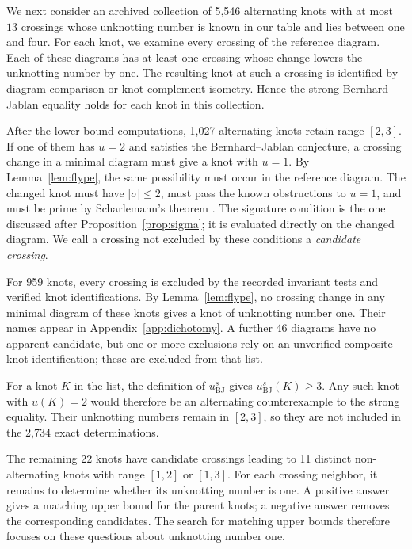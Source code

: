 \documentclass[12pt, oneside]{amsart}
\newcommand{\nChildren}{11}
\newcommand{\nDataKnots}{5{,}546}
\newcommand{\nDichotomy}{959}
\newcommand{\nDichotomyHeuristic}{46}
\newcommand{\nExact}{2{,}734}
\newcommand{\nOpenTwoThreeAlt}{1{,}027}
\newcommand{\nWithCandidates}{22}
\begin{document}
We next consider an archived collection of \nDataKnots{} alternating knots with at most $13$ crossings whose
unknotting number is known in our table and lies between one and four. For each knot,
we examine every crossing of the reference diagram. Each of these diagrams has at least one crossing whose change
lowers the unknotting number by one. The resulting knot at such a crossing is identified
by diagram comparison or knot-complement isometry. Hence the strong
Bernhard--Jablan equality holds for each knot in this collection.

After the lower-bound computations,
\nOpenTwoThreeAlt{} alternating knots retain range $[2,3]$. If one of them has $u=2$
and satisfies the Bernhard--Jablan conjecture, a crossing change in a minimal diagram must
give a knot with $u=1$. By Lemma~\ref{lem:flype}, the same possibility must occur in the
reference diagram. The changed knot must have $|\sigma|\le2$, must pass the known
obstructions to $u=1$, and must be prime by Scharlemann's theorem \cite{Scharlemann}.
The signature condition is the one discussed after
Proposition~\ref{prop:sigma}; it is evaluated directly on the changed diagram.
We call a crossing not excluded by these conditions a \emph{candidate crossing}.

For \nDichotomy{} knots, every crossing is excluded by the recorded invariant tests and
verified knot identifications. By Lemma~\ref{lem:flype}, no crossing change in
any minimal diagram of these knots gives a knot of unknotting number one.
Their names appear in Appendix~\ref{app:dichotomy}.
A further \nDichotomyHeuristic{} diagrams have no apparent candidate, but one or more exclusions rely on
an unverified composite-knot identification; these are excluded from that list.

For a knot $K$ in the list, the definition of $u^s_{\mathrm{BJ}}$ gives
$u^s_{\mathrm{BJ}}(K)\ge3$. Any such knot with $u(K)=2$ would therefore be
an alternating counterexample to the strong equality. Their unknotting
numbers remain in $[2,3]$, so they are not included in the \nExact{} exact
determinations.

The remaining \nWithCandidates{} knots have candidate crossings leading to
\nChildren{} distinct non-alternating knots with range $[1,2]$ or $[1,3]$.
For each crossing neighbor, it remains to determine whether its unknotting number
is one. A positive answer gives a matching upper bound for the parent knots; a
negative answer removes the corresponding candidates. The search for matching upper
bounds therefore focuses on these questions about unknotting number one.
\end{document}
